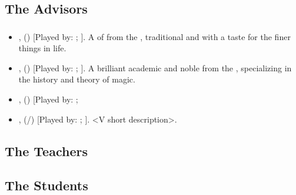 \documentclass[blue]{GL2020}
\begin{document}
\name{\bDramatisPersonae{}}

\subsection*{The Advisors}
\subsubsection*{\pFarm{}}
\begin{itemize}
	\cEvil{\MYPlaypronouns}].  A driven and influential career politician from the \pFarm, and leader of \cEvil{\their} nation's contingent of advisors.
	\item \cHedonist{\full}, (\cHedonist{\MYCharpronouns}) [Played by: \cHedonist{\MYplayer}; \cHedonist{\MYPlaypronouns}].  A \cHedonist{\cleric} of \cFarmGod{} from the \pFarm{}, traditional and with a taste for the finer things in life.
	\item \cWildCard{\full}, (\cWildCard{\MYCharpronouns}) [Played by: \cWildCard{\MYplayer}; \cWildCard{\MYPlaypronouns}].  A brilliant academic and noble from the \pFarm{}, specializing in the history and theory of magic.
	\item \cEvil{\full}, (\cEvil{\MYCharpronouns}) [Played by: \cEvil{\MYplayer}; 
	\item \cCurse{\full}, (\cCurse{\they}/\cCurse{\them}) [Played by: \cCurse{\MYplayer}; \cWildCard{\MYPlaypronouns}].  <V short description>.
\end{itemize}
\subsubsection*{\pTech{}}
\subsubsection*{\pShip{}}

\subsection*{The Teachers}
\subsubsection*{\pFarm{}}
\subsubsection*{\pTech{}}
\subsubsection*{\pShip{}}

\subsection*{The Students}
\subsubsection*{\pFarm{}}
\subsubsection*{\pTech{}}
\subsubsection*{\pShip{}}
\end{document}
